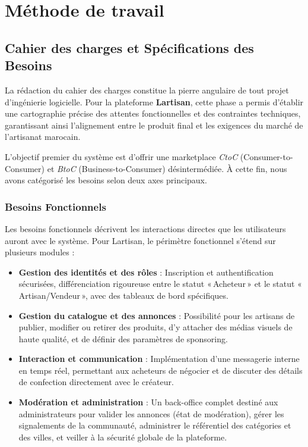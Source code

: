 \chapter{Méthode de travail}

\section{Cahier des charges et Spécifications des Besoins}
La rédaction du cahier des charges constitue la pierre angulaire de tout projet d'ingénierie logicielle. Pour la plateforme \textbf{Lartisan}, cette phase a permis d'établir une cartographie précise des attentes fonctionnelles et des contraintes techniques, garantissant ainsi l'alignement entre le produit final et les exigences du marché de l'artisanat marocain.

L'objectif premier du système est d'offrir une marketplace \textit{CtoC} (Consumer-to-Consumer) et \textit{BtoC} (Business-to-Consumer) désintermédiée. À cette fin, nous avons catégorisé les besoins selon deux axes principaux.

\subsection{Besoins Fonctionnels}
Les besoins fonctionnels décrivent les interactions directes que les utilisateurs auront avec le système. Pour Lartisan, le périmètre fonctionnel s'étend sur plusieurs modules :
\begin{itemize}
    \item \textbf{Gestion des identités et des rôles} : Inscription et authentification sécurisées, différenciation rigoureuse entre le statut «\,Acheteur\,» et le statut «\,Artisan/Vendeur\,», avec des tableaux de bord spécifiques.
    \item \textbf{Gestion du catalogue et des annonces} : Possibilité pour les artisans de publier, modifier ou retirer des produits, d'y attacher des médias visuels de haute qualité, et de définir des paramètres de sponsoring.
    \item \textbf{Interaction et communication} : Implémentation d'une messagerie interne en temps réel, permettant aux acheteurs de négocier et de discuter des détails de confection directement avec le créateur.
    \item \textbf{Modération et administration} : Un back-office complet destiné aux administrateurs pour valider les annonces (état de modération), gérer les signalements de la communauté, administrer le référentiel des catégories et des villes, et veiller à la sécurité globale de la plateforme.
\end{itemize}

